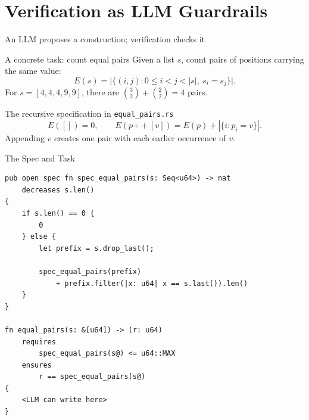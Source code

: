 \section{Verification as LLM Guardrails}
\begin{frame}{An LLM proposes a construction; verification checks it}
\begin{center}
\end{center}
\vspace{6mm}
\end{frame}

\begin{frame}{A concrete task: count equal pairs}
Given a list $s$, count pairs of positions carrying the same value:
\[
 E(s)=\bigl|\{(i,j):0\le i<j<|s|,\ s_i=s_j\}\bigr|.
\]
For $s=[4,4,4,9,9]$, there are $\binom{3}{2}+\binom{2}{2}=4$ pairs.
\begin{block}{The recursive specification in \texttt{equal\_pairs.rs}}
\[
 E([])=0,\qquad E(p\mathbin{+\!+}[v])=E(p)+|\{i:p_i=v\}|.
\]
Appending $v$ creates one pair with each earlier occurrence of $v$.
\end{block}
\end{frame}

\begin{frame}[fragile]{The Spec and Task}
\begin{lstlisting}[language={},basicstyle=\ttfamily\fontsize{6}{7}\selectfont]
pub open spec fn spec_equal_pairs(s: Seq<u64>) -> nat
    decreases s.len()
{
    if s.len() == 0 {
        0
    } else {
        let prefix = s.drop_last();

        spec_equal_pairs(prefix)
            + prefix.filter(|x: u64| x == s.last()).len()
    }
}

fn equal_pairs(s: &[u64]) -> (r: u64)
    requires
        spec_equal_pairs(s@) <= u64::MAX
    ensures
        r == spec_equal_pairs(s@)
{
    <LLM can write here>
}

\end{lstlisting}

\end{frame}

